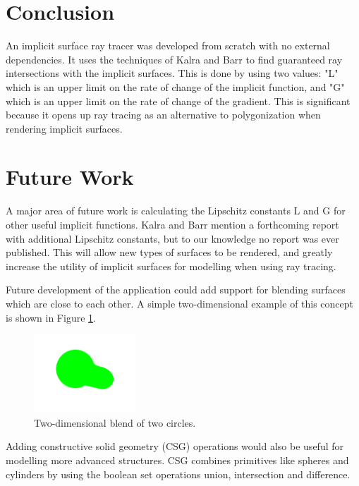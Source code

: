 \documentclass[conference]{acmsiggraph}
\begin{document}
\section{Conclusion}

An implicit surface ray tracer was developed from scratch with no external
dependencies.  It uses the techniques of Kalra and Barr \cite{KalraBarr1989}
to find guaranteed ray intersections with the implicit surfaces.  This is done
by using two values: "L" which is an upper limit on the rate of change of the implicit
function, and "G" which is an upper limit on the rate of change of the gradient.  This is significant because it opens up ray tracing as an 
alternative to polygonization when rendering implicit surfaces.

\section{Future Work}

A major area of future work is calculating the Lipschitz constants L and G
for other useful implicit functions.  Kalra and Barr \cite{KalraBarr1989} 
mention a forthcoming report with additional Lipschitz constants, but to
our knowledge no report was ever published.  This will allow new types of
surfaces to be rendered, and greatly increase the utility of implicit 
surfaces for modelling when using ray tracing.

Future development of the application could add support for blending surfaces
which are close to each other.  A simple two-dimensional example of this concept
is shown in Figure \ref{fig:blend2d}.

\begin{figure}[ht]
  \centering
  \includegraphics[width=1.5in]{figures/blend2d.png}
  \caption{Two-dimensional blend of two circles.}
  \label{fig:blend2d}
\end{figure}

Adding constructive solid geometry (CSG) operations would also be useful
for modelling more advanced structures.  CSG combines primitives like 
spheres and cylinders by using the boolean set operations union,
intersection and difference.



\end{document}
